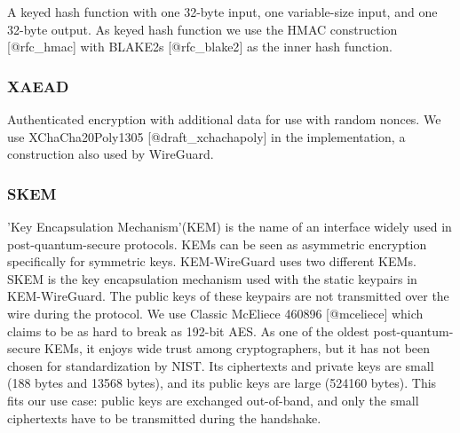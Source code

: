 A keyed hash function with one 32-byte input, one variable-size input,
and one 32-byte output. As keyed hash function we use the HMAC
construction {[}@rfc\_hmac{]} with BLAKE2s {[}@rfc\_blake2{]} as the
inner hash function.
\begin{tcolorbox}[colback=gray!]
\end{tcolorbox}

\subsubsection{XAEAD}

Authenticated encryption with additional data for use with random
nonces. We use XChaCha20Poly1305 {[}@draft\_xchachapoly{]} in the
implementation, a construction also used by WireGuard.


\begin{tcolorbox}[colback=gray!]
\end{tcolorbox}
\subsubsection{SKEM}
'Key Encapsulation Mechanism'(KEM) is the name of an interface widely
used in post-quantum-secure protocols. KEMs can be seen as asymmetric
encryption specifically for symmetric keys. KEM-WireGuard uses two different
KEMs. SKEM is the key encapsulation mechanism used with the static
keypairs in KEM-WireGuard. The public keys of these keypairs are not
transmitted over the wire during the protocol. We use Classic McEliece
460896 {[}@mceliece{]} which claims to be as hard to break as 192-bit
AES. As one of the oldest post-quantum-secure KEMs, it enjoys wide trust
among cryptographers, but it has not been chosen for standardization by
NIST. Its ciphertexts and private keys are small (188 bytes and 13568
bytes), and its public keys are large (524160 bytes). This fits our use
case: public keys are exchanged out-of-band, and only the small
ciphertexts have to be transmitted during the handshake.


\begin{tcolorbox}[colback=gray!]
\end{tcolorbox}

